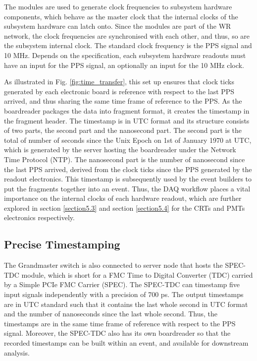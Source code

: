 The modules are used to generate clock frequencies to subsystem hardware components, which behave as the master clock that the internal clocks of the subsystem hardware can latch onto.
Since the modules are part of the WR network, the clock frequencies are synchronised with each other, and thus, so are the subsystem internal clock.
The standard clock frequency is the PPS signal and 10 MHz. 
Depends on the specification, each subsystem hardware readouts must have an input for the PPS signal, an optionally an input for the 10 MHz clock.

As illustrated in Fig. \ref{fig:time_transfer}, this set up ensures that clock ticks generated by each electronic board is reference with respect to the last PPS arrived, and thus sharing the same time frame of reference to the PPS.
As the boardreader packages the data into fragment format, it creates the timestamp in the fragment header.
The timestamp is in UTC format and its structure consists of two parts, the second part and the nanosecond part.
The second part is the total of number of seconds since the Unix Epoch on 1st of January 1970 at UTC, which is generated by the server hosting the boardreader under the Network Time Protocol (NTP).
The nanosecond part is the number of nanosecond since the last PPS arrived, derived from the clock ticks since the PPS generated by the readout electronics.
This timestamp is subsequently used by the event builders to put the fragments together into an event.
Thus, the DAQ workflow places a vital importance on the internal clocks of each hardware readout, which are further explored in section \ref{section5.3} and section \ref{section5.4} for the CRTs and PMTs electronics respectively.

\subsection{Precise Timestamping}
\label{section5.2.2}

The Grandmaster switch is also connected to server node that hosts the SPEC-TDC module, which is short for a FMC Time to Digital Converter (TDC) carried by a Simple PCIe FMC Carrier (SPEC).
The SPEC-TDC can timestamp five input signals independently with a precision of 700 ps.
The output timestamps are in UTC standard such that it contains the last whole second in UTC format and the number of nanoseconds since the last whole second.
Thus, the timestamps are in the same time frame of reference with respect to the PPS signal.
Moreover, the SPEC-TDC also has its own boardreader so that the recorded timestamps can be built within an event, and available for downstream analysis.

